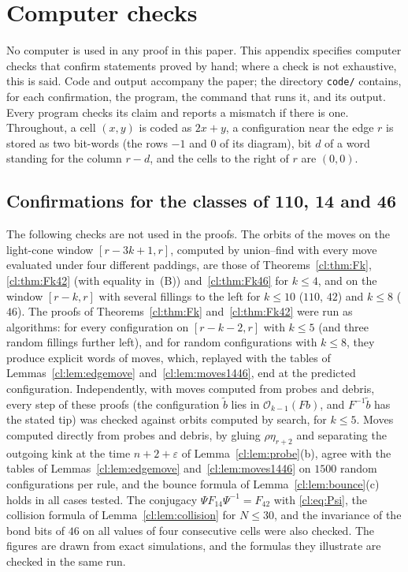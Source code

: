 \section{Computer checks}\label{app:comp}

No computer is used in any proof in this paper. This appendix specifies computer checks that confirm statements proved by hand; where a check is not exhaustive, this is said. Code and output accompany the paper; the directory \texttt{code/} contains, for each confirmation, the program, the command that runs it, and its output. Every program checks its claim and reports a mismatch if there is one. Throughout, a cell $(x,y)$ is coded as $2x+y$, a configuration near the edge $r$ is stored as two bit-words (the rows $-1$ and $0$ of its diagram), bit $d$ of a word standing for the column $r-d$, and the cells to the right of $r$ are $(0,0)$.

\subsection{Confirmations for the classes of 110, 14 and 46}\label{app:confirm}
The following checks are not used in the proofs. The orbits of the moves on the light-cone window $[r-3k+1,r]$, computed by union--find with every move evaluated under four different paddings, are those of Theorems~\ref{cl:thm:Fk}, \ref{cl:thm:Fk42} (with equality in~(B)) and~\ref{cl:thm:Fk46} for $k\le4$, and on the window $[r-k,r]$ with several fillings to the left for $k\le10$ ($110$, $42$) and $k\le8$ ($46$). The proofs of Theorems~\ref{cl:thm:Fk} and~\ref{cl:thm:Fk42} were run as algorithms: for every configuration on $[r-k-2,r]$ with $k\le5$ (and three random fillings further left), and for random configurations with $k\le8$, they produce explicit words of moves, which, replayed with the tables of Lemmas~\ref{cl:lem:edgemove} and~\ref{cl:lem:moves1446}, end at the predicted configuration. Independently, with moves computed from probes and debris, every step of these proofs (the configuration $\tilde b$ lies in $\mathcal O_{k-1}(Fb)$, and $F^{-1}\tilde b$ has the stated tip) was checked against orbits computed by search, for $k\le5$. Moves computed directly from probes and debris, by gluing $\rho\eta_{r+2}$ and separating the outgoing kink at the time $n+2+\varepsilon$ of Lemma~\ref{cl:lem:probe}(b), agree with the tables of Lemmas~\ref{cl:lem:edgemove} and~\ref{cl:lem:moves1446} on $1500$ random configurations per rule, and the bounce formula of Lemma~\ref{cl:lem:bounce}(c) holds in all cases tested. The conjugacy $\Psi F_{14}\Psi^{-1}=F_{42}$ with \eqref{cl:eq:Psi}, the collision formula of Lemma~\ref{cl:lem:collision} for $N\le30$, and the invariance of the bond bits of $46$ on all values of four consecutive cells were also checked. The figures are drawn from exact simulations, and the formulas they illustrate are checked in the same run.

